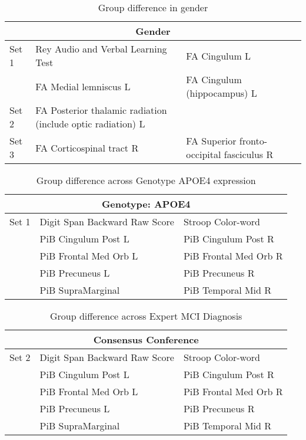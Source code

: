 \begin{table}[!]
	\centering
	\begin{tabular}{p{0.8cm}p{5.5cm}p{6cm}}
		\toprule
		\multicolumn{3}{c}{\textbf{Gender}}\\ \midrule \midrule
        
		Set 1     & Rey Audio and Verbal Learning Test   & FA Cingulum  L	\\
		\midrule
		   & FA Medial lemniscus L	& FA Cingulum (hippocampus) L		\\
		Set 2    & FA Posterior thalamic radiation \newline (include optic radiation) L& \\ \midrule
    	Set 3    & FA Corticospinal tract R& FA Superior fronto-occipital fasciculus  R \\	\midrule\bottomrule
	\end{tabular}
    \caption{Group difference in gender}
\end{table}

\begin{table}[!]
	\centering
	\begin{tabular}{p{0.8cm}p{5.5cm}p{6cm}}
		\toprule
		\multicolumn{3}{c}{\textbf{Genotype: APOE4}}\\ \midrule \midrule
		Set 1    &Digit Span Backward Raw Score & Stroop Color-word \\ 
		 &PiB Cingulum Post L &    PiB Cingulum Post R         \\
		&PiB Frontal Med Orb L & 		PiB Frontal Med Orb R \\ 
		&PiB Precuneus L & PiB Precuneus R \\ 
		& PiB SupraMarginal &  PiB Temporal Mid R \\ \midrule		 \bottomrule
	\end{tabular}
	\caption{Group difference across Genotype APOE4 expression}
\end{table}

\begin{table}[!]
	\centering
	\begin{tabular}{p{0.8cm}p{5.5cm}p{6cm}}
		\toprule
		\multicolumn{3}{c}{\textbf{Consensus Conference}}\\ \midrule \midrule
		Set 2    &Digit Span Backward Raw Score & Stroop Color-word \\ 
		 &PiB Cingulum Post L &    PiB Cingulum Post R         \\
		&PiB Frontal Med Orb L & 		PiB Frontal Med Orb R \\ 
		&PiB Precuneus L & PiB Precuneus R \\ 
		& PiB SupraMarginal &  PiB Temporal Mid R \\ \midrule
		\bottomrule
	\end{tabular}
	\caption{Group difference across Expert MCI Diagnosis}
\end{table}

